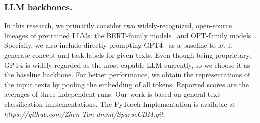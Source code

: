 \documentclass[letterpaper]{article} %
\begin{document}
\subsubsection{LLM backbones.}
In this research, we primarily consider two widely-recognized, open-source lineages of pretrained LLMs: the BERT-family models~\cite{devlin2018bert,liu2019roberta,sanh2019distilbert} and OPT-family models~\cite{zhang2022opt}. Specially, we also include directly prompting GPT4~\cite{openai2023gpt4} as a baseline to let it generate concept and task labels for given texts.
Even though being proprietary, GPT4 is widely regarded as the most capable LLM currently, so we choose it as the baseline backbone. For better performance, we obtain the representations of the input texts by pooling the embedding of all tokens. Reported scores are the averages of three independent runs. Our work is based on general text classification implementations. The PyTorch Implementation is available at \textit{https://github.com/Zhen-Tan-dmml/SparseCBM.git}.
\end{document}
